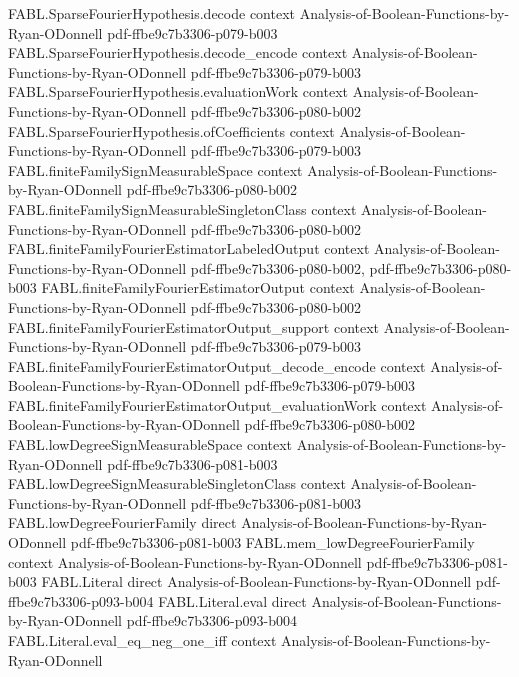\begin{theorem}
  {FABL.SparseFourierHypothesis.decode}
  {context}
  {Analysis-of-Boolean-Functions-by-Ryan-ODonnell}
  {pdf-ffbe9c7b3306-p079-b003}
\proofstep
  {FABL.SparseFourierHypothesis.decode_encode}
  {context}
  {Analysis-of-Boolean-Functions-by-Ryan-ODonnell}
  {pdf-ffbe9c7b3306-p079-b003}
\proofstep
  {FABL.SparseFourierHypothesis.evaluationWork}
  {context}
  {Analysis-of-Boolean-Functions-by-Ryan-ODonnell}
  {pdf-ffbe9c7b3306-p080-b002}
\proofstep
  {FABL.SparseFourierHypothesis.ofCoefficients}
  {context}
  {Analysis-of-Boolean-Functions-by-Ryan-ODonnell}
  {pdf-ffbe9c7b3306-p079-b003}
\proofstep
  {FABL.finiteFamilySignMeasurableSpace}
  {context}
  {Analysis-of-Boolean-Functions-by-Ryan-ODonnell}
  {pdf-ffbe9c7b3306-p080-b002}
\proofstep
  {FABL.finiteFamilySignMeasurableSingletonClass}
  {context}
  {Analysis-of-Boolean-Functions-by-Ryan-ODonnell}
  {pdf-ffbe9c7b3306-p080-b002}
\proofstep
  {FABL.finiteFamilyFourierEstimatorLabeledOutput}
  {context}
  {Analysis-of-Boolean-Functions-by-Ryan-ODonnell}
  {pdf-ffbe9c7b3306-p080-b002,
    pdf-ffbe9c7b3306-p080-b003}
\proofstep
  {FABL.finiteFamilyFourierEstimatorOutput}
  {context}
  {Analysis-of-Boolean-Functions-by-Ryan-ODonnell}
  {pdf-ffbe9c7b3306-p080-b002}
\proofstep
  {FABL.finiteFamilyFourierEstimatorOutput_support}
  {context}
  {Analysis-of-Boolean-Functions-by-Ryan-ODonnell}
  {pdf-ffbe9c7b3306-p079-b003}
\proofstep
  {FABL.finiteFamilyFourierEstimatorOutput_decode_encode}
  {context}
  {Analysis-of-Boolean-Functions-by-Ryan-ODonnell}
  {pdf-ffbe9c7b3306-p079-b003}
\proofstep
  {FABL.finiteFamilyFourierEstimatorOutput_evaluationWork}
  {context}
  {Analysis-of-Boolean-Functions-by-Ryan-ODonnell}
  {pdf-ffbe9c7b3306-p080-b002}
\proofstep
  {FABL.lowDegreeSignMeasurableSpace}
  {context}
  {Analysis-of-Boolean-Functions-by-Ryan-ODonnell}
  {pdf-ffbe9c7b3306-p081-b003}
\proofstep
  {FABL.lowDegreeSignMeasurableSingletonClass}
  {context}
  {Analysis-of-Boolean-Functions-by-Ryan-ODonnell}
  {pdf-ffbe9c7b3306-p081-b003}
\proofstep
  {FABL.lowDegreeFourierFamily}
  {direct}
  {Analysis-of-Boolean-Functions-by-Ryan-ODonnell}
  {pdf-ffbe9c7b3306-p081-b003}
\proofstep
  {FABL.mem_lowDegreeFourierFamily}
  {context}
  {Analysis-of-Boolean-Functions-by-Ryan-ODonnell}
  {pdf-ffbe9c7b3306-p081-b003}
\proofstep
  {FABL.Literal}
  {direct}
  {Analysis-of-Boolean-Functions-by-Ryan-ODonnell}
  {pdf-ffbe9c7b3306-p093-b004}
\proofstep
  {FABL.Literal.eval}
  {direct}
  {Analysis-of-Boolean-Functions-by-Ryan-ODonnell}
  {pdf-ffbe9c7b3306-p093-b004}
\proofstep
  {FABL.Literal.eval_eq_neg_one_iff}
  {context}
  {Analysis-of-Boolean-Functions-by-Ryan-ODonnell}

\end{theorem}
